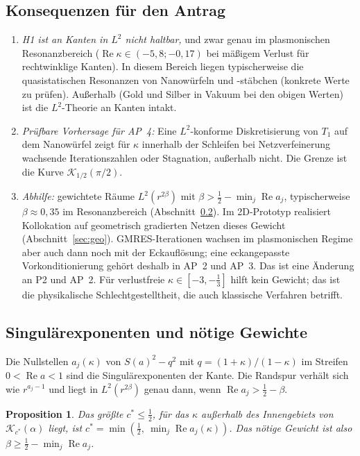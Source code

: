\documentclass[11pt, a4paper]{article}
\theoremstyle{plain}
\newtheorem{prop}[satz]{Proposition}
\theoremstyle{definition}
\newcommand{\status}[1]{\hfill{\small\sffamily[#1]}}
\begin{document}
\subsection{Konsequenzen für den Antrag}

\begin{enumerate}[leftmargin=*]
  \item \emph{H1 ist an Kanten in $L^2$ nicht haltbar,} und zwar genau im
    plasmonischen Resonanzbereich ($\operatorname{Re}\kappa\in(-5{,}8;-0{,}17)$ bei
    mäßigem Verlust für rechtwinklige Kanten). In diesem Bereich liegen
    typischerweise die quasistatischen Resonanzen von Nanowürfeln und -stäbchen
    (konkrete Werte zu prüfen). Außerhalb (Gold und Silber in Vakuum bei den obigen
    Werten) ist die $L^2$-Theorie an Kanten intakt.
  \item \emph{Prüfbare Vorhersage für AP~4:} Eine $L^2$-konforme Diskretisierung
    von $T_1$ auf dem Nanowürfel zeigt für $\kappa$ innerhalb der Schleifen bei
    Netzverfeinerung wachsende Iterationszahlen oder Stagnation, außerhalb nicht.
    Die Grenze ist die Kurve $\mathcal{K}_{1/2}(\pi/2)$.
  \item \emph{Abhilfe:} gewichtete Räume $L^2(r^{2\beta})$ mit
    $\beta>\tfrac12-\min_j\operatorname{Re}a_j$, typischerweise $\beta\approx0{,}35$ im
    Resonanzbereich (Abschnitt~\ref{sec:exponenten}). Im 2D-Prototyp
    realisiert Kollokation auf geometrisch gradierten Netzen dieses Gewicht
    (Abschnitt~\ref{sec:geo}). GMRES-Iterationen wachsen im plasmonischen Regime
    aber auch dann noch mit der Eckauflösung; eine eckangepasste
    Vorkonditionierung gehört deshalb in AP~2 und AP~3. Das ist eine Änderung an P2 und
    AP~2.
    Für verlustfreie $\kappa\in[-3,-\tfrac13]$ hilft kein Gewicht; das ist die
    physikalische Schlechtgestelltheit, die auch klassische Verfahren betrifft.
\end{enumerate}

\subsection{Singulärexponenten und nötige Gewichte}\label{sec:exponenten}

Die Nullstellen $a_j(\kappa)$ von $S(a)^2 - q^2$ mit $q=(1+\kappa)/(1-\kappa)$ im
Streifen $0<\operatorname{Re}a<1$ sind die Singulärexponenten der Kante. Die
Randspur verhält sich wie $r^{a_j-1}$ und liegt in $L^2(r^{2\beta})$ genau dann,
wenn $\operatorname{Re}a_j > \tfrac12-\beta$.

\begin{prop}\label{prop:cstar}\status{numerisch verifiziert}
Das größte $c^*\le\tfrac12$, für das $\kappa$ außerhalb des Innengebiets von
$\mathcal{K}_{c^*}(\alpha)$ liegt, ist $c^* = \min(\tfrac12,\ \min_j\operatorname{Re}a_j(\kappa))$.
Das nötige Gewicht ist also $\beta \ge \tfrac12 - \min_j\operatorname{Re}a_j$.
\end{prop}
\end{document}
